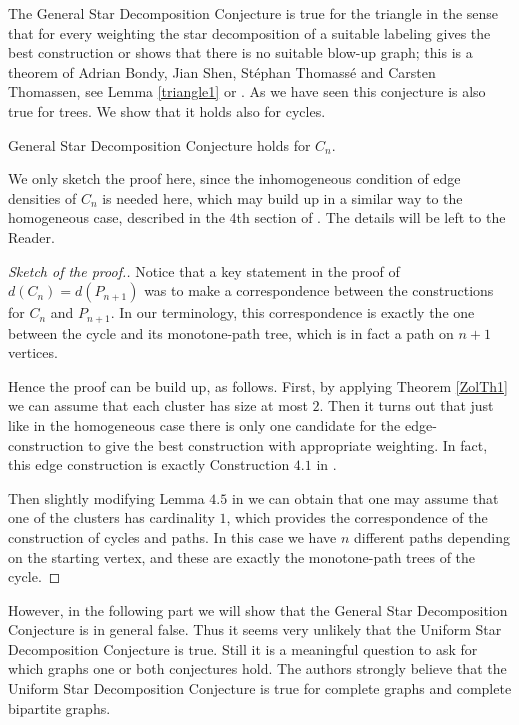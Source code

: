 \documentclass[12pt,a4paper]{amsart}
\numberwithin{equation}{section}
\begin{document}
The General Star Decomposition Conjecture is true for the triangle in the
sense that for every weighting the star decomposition of a suitable labeling
gives the best construction or shows that there is no suitable blow-up graph;
this is a theorem of  Adrian Bondy, Jian Shen, St\'ephan Thomass\'e and Carsten
Thomassen, see Lemma \ref{triangle1} or \cite{bond}. As we have seen this
conjecture is also true for trees. We  show that it holds also for cycles.  

\begin{theorem} \label{circle} 
General Star Decomposition Conjecture holds for $C_n$.
\end{theorem}

We only sketch the proof here, since the inhomogeneous condition of edge
densities of $C_n$ is needed here, which may build up in a similar way to the
homogeneous case, described in the $4$th section of \cite{nagy1}. The details
will be left to the Reader. 

\begin{proof}[Sketch of the proof.]
Notice that a key statement in the proof of $d(C_n)=d(P_{n+1})$ \cite{nagy1}
was to make a correspondence between the constructions for $C_n$ and
$P_{n+1}$. In our terminology, this correspondence is exactly the one between
the cycle and its monotone-path tree, which is in fact a path on $n+1$ vertices.
\medskip 
 
Hence the proof can be build up, as follows.
First, by  applying Theorem \ref{ZolTh1} we can assume that each cluster has
size at most $2$. Then it  turns out that just like in the homogeneous case
\cite{nagy1} there is only one candidate for the edge-construction to give the
best construction with appropriate weighting. In fact, this edge construction
is exactly Construction $4.1$ in \cite{nagy1}.
 
Then slightly modifying Lemma $4.5$ in \cite{nagy1} we can obtain that one may
assume that one of the clusters has cardinality $1$, which provides the
correspondence of the construction of cycles and paths. 
In this case we have $n$ different paths depending on the starting vertex, and
these are exactly the monotone-path trees of the cycle. 
\end{proof}

However, in the following part we will show that the   
 General Star Decomposition Conjecture is in general false. Thus it seems
 very unlikely that the Uniform Star Decomposition Conjecture is true. Still it
 is a meaningful question to ask for which graphs one or both conjectures
 hold. The authors strongly believe that the Uniform Star Decomposition
Conjecture is true for complete graphs and complete bipartite graphs. 
\end{document}
